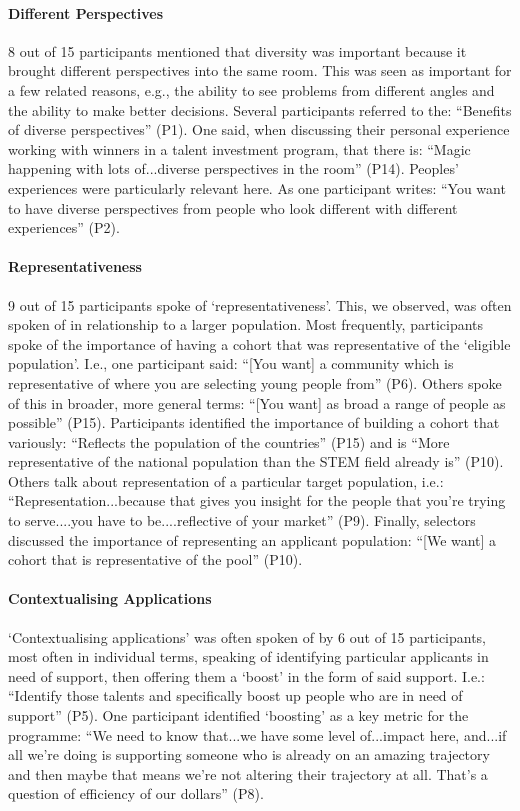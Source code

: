 \paragraph{Different Perspectives}
8 out of 15 participants mentioned that diversity was important because it brought different perspectives into the same room. This was seen as important for a few related reasons, e.g., the ability to see problems from different angles and the ability to make better decisions. Several participants referred to the: ``Benefits of diverse perspectives'' (P1). One said, when discussing their personal experience working with winners in a talent investment program, that there is: ``Magic happening with lots of...diverse perspectives in the room'' (P14). Peoples' experiences were particularly relevant here. As one participant writes: ``You want to have diverse perspectives from people who look different with different experiences'' (P2).

\paragraph{Representativeness}
9 out of 15 participants spoke of `representativeness'. This, we observed, was often spoken of in relationship to a larger population. Most frequently, participants spoke of the importance of having a cohort that was representative of the `eligible population'. I.e., one participant said: ``[You want] a community which is representative of where you are selecting young people from'' (P6). Others spoke of this in broader, more general terms: ``[You want] as broad a range of people as possible'' (P15). Participants identified the importance of building a cohort that variously: ``Reflects the population of the countries'' (P15) and is ``More representative of the national population than the STEM field already is'' (P10). Others talk about representation of a particular target population, i.e.: ``Representation...because that gives you insight for the people that you're trying to serve....you have to be....reflective of your market'' (P9). Finally, selectors discussed the importance of representing an applicant population: ``[We want] a cohort that is representative of the pool'' (P10).

\paragraph{Contextualising Applications}
`Contextualising applications' was often spoken of by 6 out of 15 participants, most often in individual terms, speaking of identifying particular applicants in need of support, then offering them a `boost' in the form of said support. I.e.: ``Identify those talents and specifically boost up people who are in need of support'' (P5). One participant identified `boosting' as a key metric for the programme: ``We need to know that...we have some level of...impact here, and...if all we're doing is supporting someone who is already on an amazing trajectory and then maybe that means we're not altering their trajectory at all. That's a question of efficiency of our dollars'' (P8).

